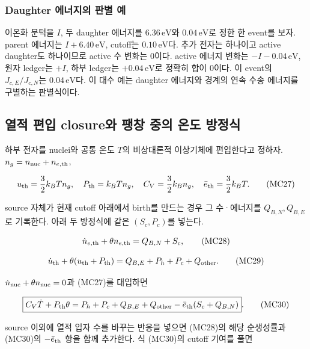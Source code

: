 \documentclass[11pt,a4paper]{article}
\begin{document}
\hypertarget{daughter-uxc5d0uxb108uxc9c0uxc758-uxd310uxbcc4-uxc608}{%
\subsubsection{Daughter 에너지의 판별 예}\label{daughter-uxc5d0uxb108uxc9c0uxc758-uxd310uxbcc4-uxc608}}

이온화 문턱을 \(I\), 두 daughter 에너지를 \(6.36\,\mathrm{eV}\)와 \(0.04\,\mathrm{eV}\)로 정한 한 event를 보자. parent 에너지는 \(I+6.40\,\mathrm{eV}\), cutoff는 \(0.10\,\mathrm{eV}\)다. 추가 전자는 하나이고 active daughter도 하나이므로 active 수 변화는 0이다. active 에너지 변화는 \(-I-0.04\,\mathrm{eV}\), 원자 ledger는 \(+I\), 하부 ledger는 \(+0.04\,\mathrm{eV}\)로 정확히 합이 0이다. 이 event의 \(J_{c,E}/J_{c,N}\)는 \(0.04\,\mathrm{eV}\)다. 이 대수 예는 daughter 에너지와 경계의 연속 수송 에너지를 구별하는 판별식이다.

\hypertarget{uxc5f4uxc801-uxd3b8uxc785-closureuxc640-uxd33duxcc3d-uxc911uxc758-uxc628uxb3c4-uxbc29uxc815uxc2dd}{%
\subsection{열적 편입 closure와 팽창 중의 온도 방정식}\label{uxc5f4uxc801-uxd3b8uxc785-closureuxc640-uxd33duxcc3d-uxc911uxc758-uxc628uxb3c4-uxbc29uxc815uxc2dd}}

하부 전자를 nuclei와 공통 온도 \(T\)의 비상대론적 이상기체에 편입한다고 정하자. \(n_g=n_{\rm nuc}+n_{e,\rm th}\),

\[
u_{\rm th}=\frac32k_BTn_g,\quad
P_{\rm th}=k_BTn_g,\quad
C_V=\frac32k_Bn_g,\quad\bar e_{\rm th}=\frac32k_BT.
\tag{MC27}
\]

source 자체가 현재 cutoff 아래에서 birth를 만드는 경우 그 수·에너지를 \(Q_{B,N},Q_{B,E}\)로 기록한다. 아래 두 방정식에 같은 \((S_c,P_c)\)를 넣는다.

\[
\dot n_{e,\rm th}+\theta n_{e,\rm th}=Q_{B,N}+S_c,
\tag{MC28}
\]

\[
\dot u_{\rm th}+\theta(u_{\rm th}+P_{\rm th})
=Q_{B,E}+P_h+P_c+Q_{\rm other}.
\tag{MC29}
\]

\(\dot n_{\rm nuc}+\theta n_{\rm nuc}=0\)과 (MC27)를 대입하면

\[
\boxed{C_V\dot T+P_{\rm th}\theta
=P_h+P_c+Q_{B,E}+Q_{\rm other}
-\bar e_{\rm th}(S_c+Q_{B,N})}.
\tag{MC30}
\]

source 이외에 열적 입자 수를 바꾸는 반응을 넣으면 (MC28)의 해당 순생성률과 (MC30)의 \(-\bar e_{\rm th}\) 항을 함께 추가한다. 식 (MC30)의 cutoff 기여를 풀면
\end{document}

